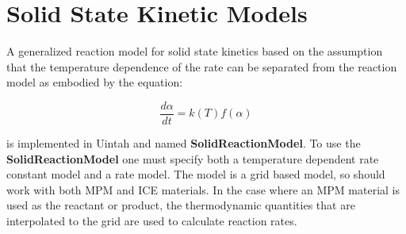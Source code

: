 

\section{Solid State Kinetic Models}

A generalized reaction model for solid state kinetics based on the
assumption that the temperature dependence of the rate can be separated
from the reaction model as embodied by the equation:

\begin{equation}
\frac{d\alpha}{dt}=k(T)f(\alpha)
\end{equation}

\noindent is implemented in Uintah and named \textbf{SolidReactionModel}.  To
use the \textbf{SolidReactionModel} one must specify both a temperature
dependent rate constant model and a rate model.  The model is a grid based
model, so should work with both MPM and ICE materials.  In the case where an MPM
material is used as the reactant or product, the thermodynamic quantities
that are interpolated to the grid are used to calculate reaction rates.   

